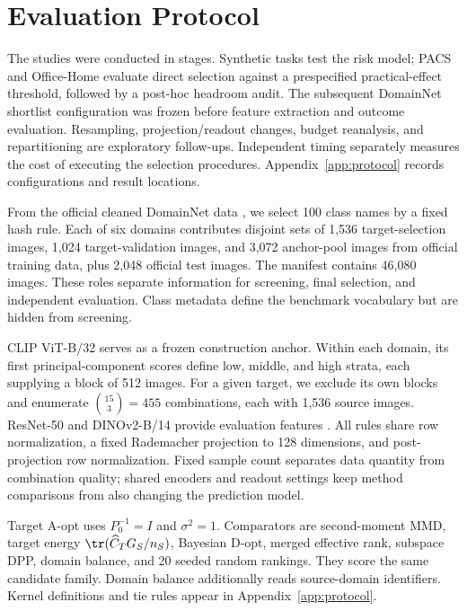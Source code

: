 \section{Evaluation Protocol}
\label{sec:protocol}
The studies were conducted in stages. Synthetic tasks test the risk model; PACS and Office-Home \citep{li2017,venkateswara2017} evaluate direct selection against a prespecified practical-effect threshold, followed by a post-hoc headroom audit. The subsequent DomainNet shortlist configuration was frozen before feature extraction and outcome evaluation. Resampling, projection/readout changes, budget reanalysis, and repartitioning are exploratory follow-ups. Independent timing separately measures the cost of executing the selection procedures. Appendix~\ref{app:protocol} records configurations and result locations.

From the official cleaned DomainNet data \citep{peng2019}, we select 100 class names by a fixed hash rule. Each of six domains contributes disjoint sets of 1,536 target-selection images, 1,024 target-validation images, and 3,072 anchor-pool images from official training data, plus 2,048 official test images. The manifest contains 46,080 images. These roles separate information for screening, final selection, and independent evaluation. Class metadata define the benchmark vocabulary but are hidden from screening.

CLIP ViT-B/32 \citep{radford2021} serves as a frozen construction anchor. Within each domain, its first principal-component scores define low, middle, and high strata, each supplying a block of 512 images. For a given target, we exclude its own blocks and enumerate $\binom{15}{3}=455$ combinations, each with 1,536 source images. ResNet-50 and DINOv2-B/14 provide evaluation features \citep{he2016,oquab2024}. All rules share row normalization, a fixed Rademacher projection to 128 dimensions, and post-projection row normalization. Fixed sample count separates data quantity from combination quality; shared encoders and readout settings keep method comparisons from also changing the prediction model.

Target A-opt uses $P_0^{-1}=I$ and $\sigma^2=1$. Comparators are second-moment MMD, target energy $\tr(\widehat C_TG_S/n_S)$, Bayesian D-opt, merged effective rank, subspace DPP, domain balance, and 20 seeded random rankings. They score the same candidate family. Domain balance additionally reads source-domain identifiers. Kernel definitions and tie rules appear in Appendix~\ref{app:protocol}.

